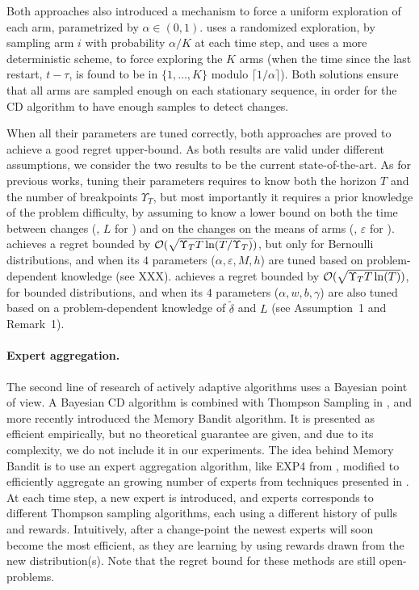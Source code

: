 Both approaches also introduced a mechanism to force a uniform exploration of each arm, parametrized by $\alpha\in(0,1)$.
\CUSUMUCB{} uses a randomized exploration, by sampling arm $i$ with probability $\alpha/K$ at each time step,
and \MUCB{} uses a more deterministic scheme, to force exploring the $K$ arms (when the time since the last restart, $t - \tau$, is found to be in $\{1,\dots,K\}$ modulo $\lceil 1/\alpha \rceil$).
Both solutions ensure that all arms are sampled enough on each stationary sequence, in order for the CD algorithm to have enough \iid{} samples to detect changes.

When all their parameters are tuned correctly, both approaches are proved to achieve a good regret upper-bound.
As both results are valid under different assumptions, we consider the two results to be the current state-of-the-art.
As for previous works, tuning their parameters requires to know both the horizon $T$ and the number of breakpoints $\Upsilon_T$, but most importantly it requires a prior knowledge of the problem difficulty, by assuming to know a lower bound on both the time between changes (\eg, $L$ for \MUCB) and on the changes on the means of arms (\eg, $\varepsilon$ for \CUSUM).
%
\CUSUMUCB{} achieves a regret bounded by $\mathcal{O}(\sqrt{\Upsilon_T T \ln(T / \Upsilon_T)})$, but only for Bernoulli distributions,
and when its $4$ parameters ($\alpha,\varepsilon,M,h$) are tuned based on problem-dependent knowledge (see XXX).
%
\MUCB{} achieves a regret bounded by $\mathcal{O}(\sqrt{\Upsilon_T T \ln(T)})$, for bounded distributions, and when its $4$ parameters ($\alpha,w,b,\gamma$) are also tuned based on a problem-dependent knowledge of $\tilde{\delta}$ and $L$ (see Assumption~1 and Remark~1).



\paragraph{Expert aggregation.}
%
The second line of research of actively adaptive algorithms uses a Bayesian point of view.
A Bayesian CD algorithm is combined with Thompson Sampling in \cite{MellorShapiro13},
and more recently \cite{Alami17} introduced the Memory Bandit algorithm. It is presented as efficient empirically, but no theoretical guarantee are given, and due to its complexity, we do not include it in our experiments.
The idea behind Memory Bandit is to use an expert aggregation algorithm, like EXP4 from \cite{Auer02}, modified to efficiently aggregate an growing number of experts from techniques presented in \cite{Mourtada17}.
At each time step, a new expert is introduced, and experts corresponds to different Thompson sampling algorithms, each using a different history of pulls and rewards. Intuitively, after a change-point the newest experts will soon become the most efficient, as they are learning by using rewards drawn from the new distribution(s).
%
Note that the regret bound for these methods are still open-problems.



